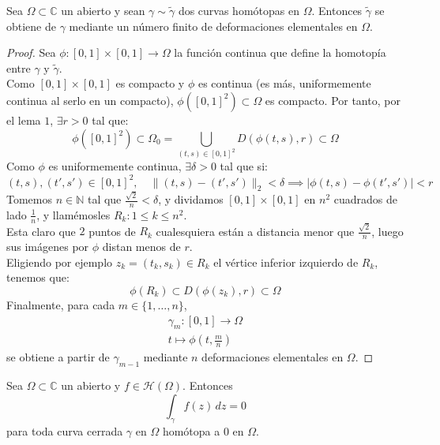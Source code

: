\begin{lema}[Lema 3]
    Sea $\Omega \subset \mathbb{C}$ un abierto y sean $\gamma \sim \tilde{\gamma}$ dos curvas homótopas en $\Omega$. Entonces $\tilde{\gamma}$ se obtiene de $\gamma$ mediante un número finito de deformaciones elementales en $\Omega$.
\end{lema}

\begin{proof}
    Sea $\phi : [0,1] \times [0,1] \to \Omega$ la función continua que define la homotopía entre $\gamma$ y $\tilde{\gamma}$.\\
    Como $[0,1] \times [0,1]$ es compacto y $\phi$ es continua (es más, uniformemente continua al serlo en un compacto), $\phi([0,1]^2) \subset \Omega$ es compacto. Por tanto, por el lema $1$, $\exists r > 0$ tal que:
    \[
        \phi([0,1]^2) \subset
        \Omega_0 =
        \bigcup_{(t,s) \in [0,1]^2} D(\phi(t,s), r) \subset 
        \Omega
    \]
    Como $\phi$ es uniformemente continua, $\exists \delta > 0$ tal que si:
    \[
    (t,s),(t',s') \in [0,1]^2, \quad
    \lVert (t,s) - (t',s') \rVert_2 < \delta \implies
    |\phi(t,s) - \phi(t',s')| < r
    \]
    Tomemos $n \in \mathbb{N}$ tal que $\frac{\sqrt{2}}{n} < \delta$, y dividamos $[0,1] \times [0,1]$ en $n^2$ cuadrados de lado $\frac{1}{n}$, y llamémosles $R_k: 1 \leq k \leq n^2$.\\
    Esta claro que $2$ puntos de $R_k$ cualesquiera están a distancia menor que $\frac{\sqrt{2}}{n}$, luego sus imágenes por $\phi$ distan menos de $r$.\\
    Eligiendo por ejemplo $z_k = (t_k,s_k) \in R_k$ el vértice inferior izquierdo de $R_k$, tenemos que:
    \[
        \phi(R_k) \subset D(\phi(z_k), r) \subset \Omega
    \]
    Finalmente, para cada $m \in \{1, \ldots, n\}$, 
    \[
        \begin{matrix}
            \gamma_m : [0,1] \to \Omega \\
            t \mapsto \phi(t, \frac{m}{n})
        \end{matrix}
    \]
    se obtiene a partir de $\gamma_{m-1}$ mediante $n$ deformaciones elementales en $\Omega$.
\end{proof}

\begin{teorema} 
    Sea $\Omega \subset \mathbb{C}$ un abierto y $f \in \mathcal{H}(\Omega)$. Entonces 
    \[
        \int_{\gamma} f(z) \, dz = 0
    \]
    para toda curva cerrada $\gamma$ en $\Omega$ homótopa a $0$ en $\Omega$.
\end{teorema}

